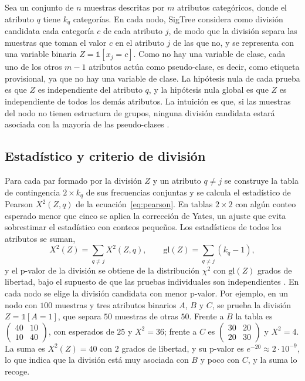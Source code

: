 Sea un conjunto de $n$ muestras descritas por $m$ atributos categóricos, donde el
atributo $q$ tiene $k_q$ categorías. En cada nodo, SigTree considera como división
candidata cada categoría $c$ de cada atributo $j$, de modo que la división separa las muestras
que toman el valor $c$ en el atributo $j$ de las que no, y se representa con una
variable binaria $Z = \mathbb{1}[x_j = c]$. Como no hay una variable de clase,
cada uno de los otros $m-1$ atributos actúa como pseudo-clase, es decir, como etiqueta provisional, ya que no hay una variable de clase. La hipótesis
nula de cada prueba es que $Z$ es independiente del atributo $q$, y la hipótesis
nula global es que $Z$ es independiente de todos los demás atributos. La intuición
es que, si las muestras del nodo no tienen estructura de grupos, ninguna división
candidata estará asociada con la mayoría de las pseudo-clases \cite[Sec.~3]{Hu2025}.

\subsection{Estadístico y criterio de división}

Para cada par formado por la división $Z$ y un atributo $q \ne j$ se construye la
tabla de contingencia $2 \times k_q$ de sus frecuencias conjuntas y se calcula el
estadístico de Pearson $X^2(Z, q)$ de la ecuación~\eqref{eq:pearson}. En tablas
$2 \times 2$ con algún conteo esperado menor que cinco se aplica la corrección de Yates, un ajuste que evita sobrestimar el estadístico con conteos pequeños. Los estadísticos de todos los atributos se suman,
\begin{equation}\label{eq:sigtree}
  X^2(Z) = \sum_{q \ne j} X^2(Z, q), \qquad
  \mathrm{gl}(Z) = \sum_{q \ne j} (k_q - 1),
\end{equation}
y el p-valor de la división se obtiene de la distribución $\chi^2$ con
$\mathrm{gl}(Z)$ grados de libertad, bajo el supuesto de que las pruebas
individuales son independientes \cite[Sec.~3.3]{Hu2025}. En cada nodo se elige la
división candidata con menor p-valor. Por ejemplo, en un nodo con $100$ muestras y tres atributos binarios $A$, $B$ y $C$, se prueba la división $Z = \mathbb{1}[A = 1]$, que separa $50$ muestras de otras $50$. Frente a $B$ la tabla es $\begin{pmatrix} 40 & 10 \\ 10 & 40 \end{pmatrix}$, con esperados de $25$ y $X^2 = 36$; frente a $C$ es $\begin{pmatrix} 30 & 20 \\ 20 & 30 \end{pmatrix}$ y $X^2 = 4$. La suma es $X^2(Z) = 40$ con $2$ grados de libertad, y su p-valor es $e^{-20} \approx 2 \cdot 10^{-9}$, lo que indica que la división está muy asociada con $B$ y poco con $C$, y la suma lo recoge.

